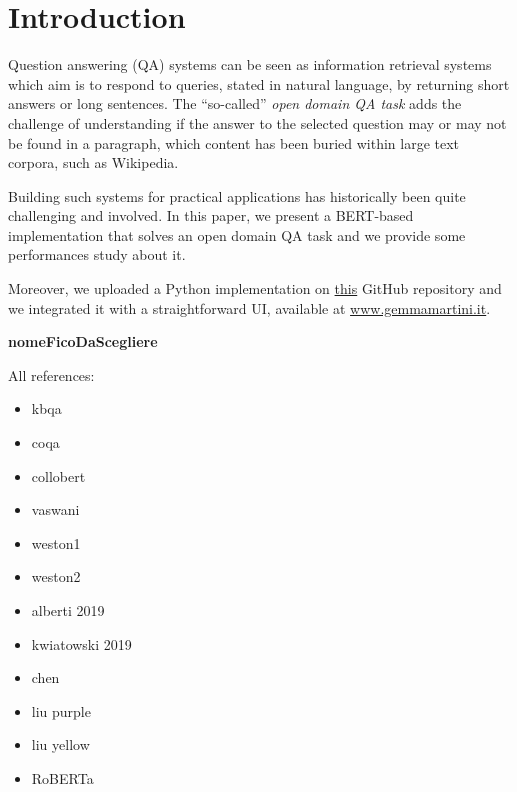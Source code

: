 \documentclass[12pt,a4paper,hidelinks]{article}
\newcommand{\nomefico}{\textbf{nomeFicoDaScegliere}}
\begin{document}

\tableofcontents
\thispagestyle{empty}
\newpage
\setcounter{page}{1}


\section{Introduction}\label{sec:intro}
Question answering (QA) systems can be seen as information retrieval systems which aim is to respond to queries, stated in natural language, by returning short answers or long sentences.
The ``so-called'' \emph{open domain QA task} adds the challenge of understanding if the answer to the selected question may or may not be found in a paragraph, which content has been buried within large text corpora, such as Wikipedia.

\vspace{0.2cm}

Building such systems for practical applications has historically been quite challenging and involved.
In this paper, we present a BERT-based implementation that solves an open domain QA task and we provide some performances study about it.

Moreover, we uploaded a Python implementation on   \href{www.google.com}{this} GitHub repository and we integrated it with a straightforward UI, available at \href{www.gemmamartini.it}{www.gemmamartini.it}.

\nomefico

All references:
\begin{itemize}
  \item kbqa~\cite{kbqa}    
  \item coqa~\cite{coqa}
  \item collobert~\cite{Collobert}
  \item vaswani~\cite{vaswani}
  \item weston1~\cite{weston-tracking}
  \item weston2~\cite{weston-reading}
  \item alberti 2019~\cite{alberti}
  \item kwiatowski 2019~\cite{kwiatowski}
  \item chen~\cite{chen}
  \item liu purple~\cite{liu-purple}
  \item liu yellow~\cite{liu-yellow}
  \item RoBERTa~\cite{roberta}
\end{itemize}
\end{document}
